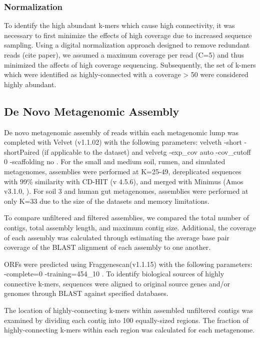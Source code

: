 \documentclass[11pt]{article} %
\begin{document}
\subsubsection{Normalization}

To identify the high abundant k-mers which cause high connectivity, it was necessary to first minimize the effects of high coverage due to increased sequence sampling.  Using a digital normalization approach designed to remove redundant reads (cite paper), we assumed a maximum coverage per read (C=5) and thus minimized the affects of high coverage sequencing.  Subsequently, the set of k-mers which were identified as highly-connected with a coverage > 50 were considered highly abundant.  

\subsection{De Novo Metagenomic Assembly}

De novo metagenomic assembly of reads within each metagenomic lump was completed with Velvet (v1.1.02) with the following parameters: velveth -short -shortPaired (if applicable to the dataset) and velvetg -exp\_cov auto -cov\_cutoff 0 -scaffolding no \cite{Zerbino:2008p665}.  For the small and medium soil, rumen, and simulated metagenomes, assemblies were performed at K=25-49, dereplicated sequences with 99\% similarity with CD-HIT (v 4.5.6), and merged with Minimus (Amos v3.1.0, \cite{Sommer:2007p1253}).  For soil 3 and human gut metagenomes, assemblies were performed at only K=33 due to the size of the datasets and memory limitations.  

To compare unfiltered and filtered assemblies, we compared the total number of contigs, total assembly length, and maximum contig size.  Additional, the coverage of each assembly was calculated through estimating the average base pair coverage of the BLAST alignment of each assembly to one another.  

ORFs were predicted using Fraggenescan(v1.1.15) with the following parameters: -complete=0 -training=454\_10 \cite{Rho:2010p397}.   To identify biological sources of highly connective k-mers, sequences were aligned to original source genes and/or genomes through BLAST against specified databases.

The location of highly-connecting k-mers within assembled unfiltered contigs was examined by dividing each contig into 100 equally-sized regions.  The fraction of highly-connecting k-mers within each region was calculated for each metagenome.
 



\end{document}
